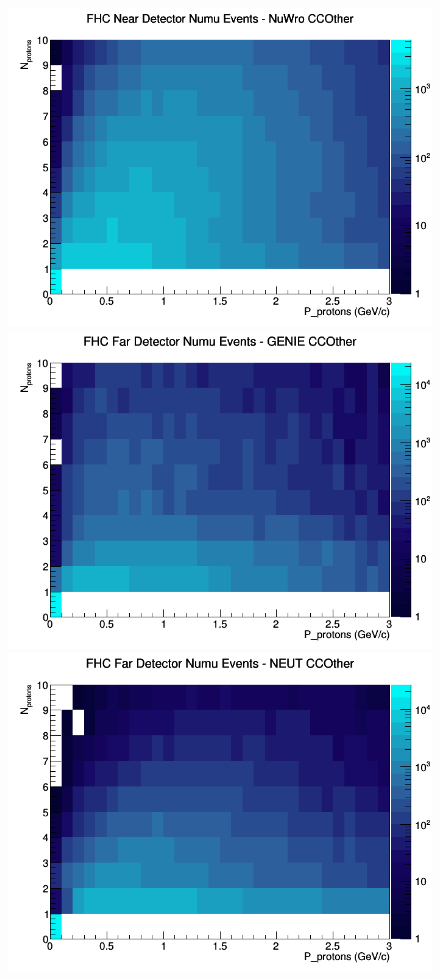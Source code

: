 \begin{figure}[h]
\includegraphics[width=\linewidth]{N_P/nominal/protons/CCOther_FHC_ND_numu_N_P_NuWro.png}
\endminipage
\newline
{}
\includegraphics[width=\linewidth]{N_P/nominal/protons/CCOther_FHC_FD_numu_N_P_GENIE.png}
\endminipage
{}
\includegraphics[width=\linewidth]{N_P/nominal/protons/CCOther_FHC_FD_numu_N_P_NEUT.png}

\end{figure}

